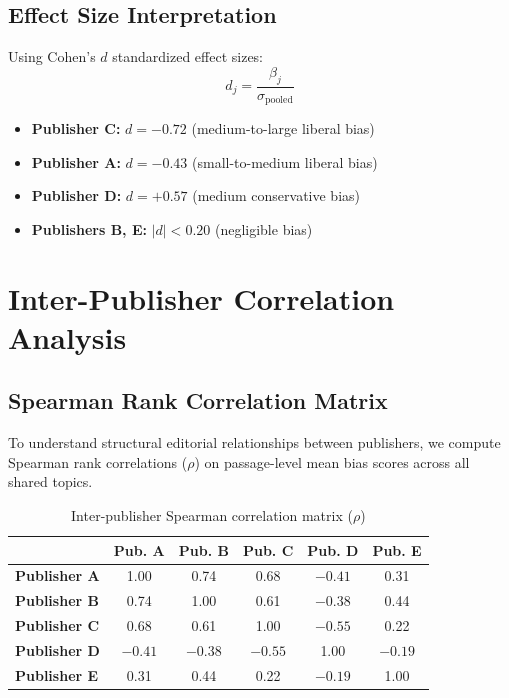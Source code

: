 \documentclass[11pt,a4paper]{article}
\begin{document}
\subsection{Effect Size Interpretation}

Using Cohen's $d$ standardized effect sizes:
\begin{equation}
d_j = \frac{\beta_j}{\sigma_\text{pooled}}
\end{equation}

\begin{itemize}
    \item \textbf{Publisher C:} $d = -0.72$ (medium-to-large liberal bias)
    \item \textbf{Publisher A:} $d = -0.43$ (small-to-medium liberal bias)
    \item \textbf{Publisher D:} $d = +0.57$ (medium conservative bias)
    \item \textbf{Publishers B, E:} $|d| < 0.20$ (negligible bias)
\end{itemize}

\section{Inter-Publisher Correlation Analysis}

\subsection{Spearman Rank Correlation Matrix}

To understand structural editorial relationships between publishers, we compute Spearman rank correlations ($\rho$) on passage-level mean bias scores across all shared topics.

\begin{table}[H]
\centering
\caption{Inter-publisher Spearman correlation matrix ($\rho$)}
\begin{tabular}{lccccc}
\toprule
& \textbf{Pub. A} & \textbf{Pub. B} & \textbf{Pub. C} & \textbf{Pub. D} & \textbf{Pub. E} \\
\midrule
\textbf{Publisher A} & 1.00 & 0.74 & 0.68 & $-0.41$ & 0.31 \\
\textbf{Publisher B} & 0.74 & 1.00 & 0.61 & $-0.38$ & 0.44 \\
\textbf{Publisher C} & 0.68 & 0.61 & 1.00 & $-0.55$ & 0.22 \\
\textbf{Publisher D} & $-0.41$ & $-0.38$ & $-0.55$ & 1.00 & $-0.19$ \\
\textbf{Publisher E} & 0.31 & 0.44 & 0.22 & $-0.19$ & 1.00 \\
\bottomrule
\end{tabular}
\label{tab:spearman-correlation}
\end{table}
\end{document}
